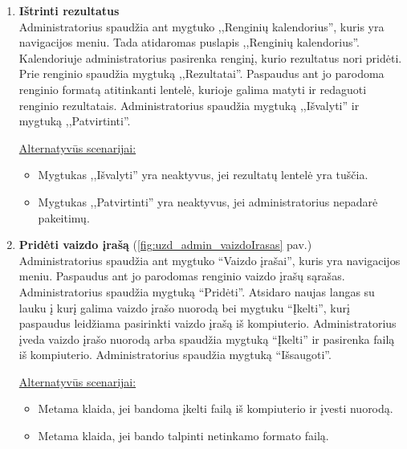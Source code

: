 \documentclass{VUMIFPSkursinis}
\begin{document}
\begin{enumerate} [label = \textbf{U\arabic*.}]
			\item \textbf{Ištrinti rezultatus}   \\
					Administratorius spaudžia ant mygtuko ,,Renginių kalendorius'', kuris yra navigacijos meniu. Tada atidaromas puslapis ,,Renginių kalendorius''. Kalendoriuje administratorius pasirenka renginį, kurio rezultatus nori pridėti. Prie renginio spaudžia mygtuką ,,Rezultatai''. Paspaudus ant jo parodoma renginio formatą atitinkanti lentelė, kurioje galima matyti ir redaguoti renginio rezultatais. Administratorius spaudžia mygtuką ,,Išvalyti'' ir mygtuką ,,Patvirtinti''.
					
					\underline{Alternatyvūs scenarijai:}
					\begin{itemize}
						\item Mygtukas ,,Išvalyti'' yra neaktyvus, jei rezultatų lentelė yra tuščia.
						\item Mygtukas ,,Patvirtinti'' yra neaktyvus, jei administratorius nepadarė pakeitimų.
					\end{itemize}
				
			\item \textbf{Pridėti vaizdo įrašą} (\ref{fig:uzd_admin_vaizdoIrasas} pav.)\\
					Administratorius spaudžia ant mygtuko “Vaizdo įrašai”, kuris yra navigacijos meniu. Paspaudus ant jo parodomas renginio vaizdo įrašų sąrašas. Administratorius spaudžia mygtuką “Pridėti”. Atsidaro naujas langas su lauku į kurį galima vaizdo įrašo nuorodą bei mygtuku “Įkelti”, kurį paspaudus leidžiama pasirinkti vaizdo įrašą iš kompiuterio. Administratorius įveda vaizdo įrašo nuorodą arba spaudžia mygtuką “Įkelti” ir pasirenka failą iš kompiuterio. Administratorius spaudžia mygtuką “Išsaugoti”.
					
					\underline{Alternatyvūs scenarijai:}
					\begin{itemize}
						\item Metama klaida, jei bandoma įkelti failą iš kompiuterio ir įvesti nuorodą.
						\item Metama klaida, jei bando talpinti netinkamo formato failą.
					\end{itemize}
				

\end{enumerate}
\end{document}
